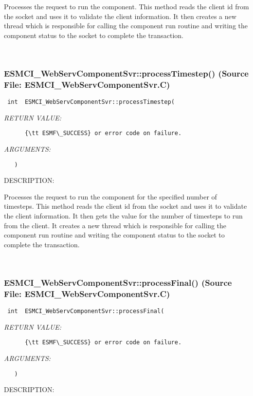       Processes the request to run the component.  This method reads the
      client id from the socket and uses it to validate the client information.
      It then creates a new thread which is responsible for calling the
      component run routine and writing the component status to the socket
      to complete the transaction.
   
 
\mbox{}\hrulefill\
 
\subsubsection{ESMCI\_WebServComponentSvr::processTimestep() (Source File: ESMCI\_WebServComponentSvr.C)}


  
\begin{verbatim} int  ESMCI_WebServComponentSvr::processTimestep(\end{verbatim}{\em RETURN VALUE:}
\begin{verbatim}      {\tt ESMF\_SUCCESS} or error code on failure.\end{verbatim}{\em ARGUMENTS:}
\begin{verbatim}   )\end{verbatim}
{\sf DESCRIPTION:\\ }


      Processes the request to run the component for the specified number of
      timesteps.  This method reads the client id from the socket and uses it
      to validate the client information.  It then gets the value for the
      number of timesteps to run from the client.
      It creates a new thread which is responsible for calling the
      component run routine and writing the component status to the socket
      to complete the transaction.
   
 
\mbox{}\hrulefill\
 
\subsubsection{ESMCI\_WebServComponentSvr::processFinal() (Source File: ESMCI\_WebServComponentSvr.C)}


  
\begin{verbatim} int  ESMCI_WebServComponentSvr::processFinal(\end{verbatim}{\em RETURN VALUE:}
\begin{verbatim}      {\tt ESMF\_SUCCESS} or error code on failure.\end{verbatim}{\em ARGUMENTS:}
\begin{verbatim}   )\end{verbatim}
{\sf DESCRIPTION:\\ }


